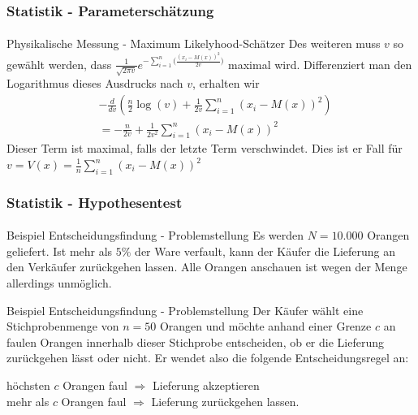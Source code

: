 \documentclass{beamer}
\begin{document}
\begin{frame}
    \frametitle{Statistik - Parameterschätzung}
\framesubtitle{}
\begin{block}{Physikalische Messung - Maximum Likelyhood-Schätzer}
Des weiteren muss $v$ so gewählt werden, dass $ \frac {1}{ \sqrt{2 \pi v }} e^{- \sum_{i=1}^n \bigl( \frac{(x_i- M(x))^2}{ 2v} \bigr)}$ maximal wird. Differenziert man den Logarithmus dieses Ausdrucks nach $v$, erhalten wir
\begin{align*}
& -\frac{d}{dv} (\frac{n}{2} \log(v) + \frac{1}{2v} \sum_{i=1}^n (x_i - M(x))^2 ) \\
& = -\frac{n}{2v} + \frac{1}{2v^2}\sum_{i=1}^n (x_i - M(x))^2 
\end{align*}
Dieser Term ist maximal, falls der letzte Term verschwindet. Dies ist er Fall für
$v = V(x) =\frac{1}{n}\sum_{i=1}^n (x_i - M(x))^2$
\end{block}

 \end{frame}





\begin{frame}
    \frametitle{Statistik - Hypothesentest}
\framesubtitle{}

\begin{block}{Beispiel Entscheidungsfindung - Problemstellung}
Es werden $N= 10.000$ Orangen geliefert. Ist mehr als $5\%$ der Ware verfault, kann der Käufer  die Lieferung an den Verkäufer zurückgehen lassen.
Alle Orangen anschauen ist wegen der Menge allerdings unmöglich.
\end{block}

\begin{block}{Beispiel Entscheidungsfindung - Problemstellung}
Der   Käufer wählt eine Stichprobenmenge  von $n=50$ Orangen  und möchte anhand einer Grenze  $c$ an faulen Orangen innerhalb dieser Stichprobe entscheiden,
ob er die Lieferung zurückgehen lässt oder nicht.  Er wendet also die folgende Entscheidungsregel an:
\begin{center}
höchsten $c$ Orangen  faul $\Rightarrow$ Lieferung akzeptieren \\
mehr als  $c$ Orangen  faul $\Rightarrow$ Lieferung  zurückgehen lassen.
\end{center}
\end{block}



 \end{frame}
\end{document}
